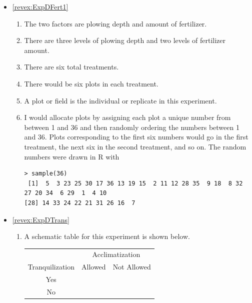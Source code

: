 \documentclass[10pt,openany]{book}\usepackage[]{graphicx}\usepackage[]{color}
\makeatletter
\newenvironment{kframe}{%
 \def\at@end@of@kframe{}%
 \ifinner\ifhmode%
  \def\at@end@of@kframe{\end{minipage}}%
  \begin{minipage}{\columnwidth}%
 \fi\fi%
 \def\FrameCommand##1{\hskip\@totalleftmargin \hskip-\fboxsep
 \colorbox{shadecolor}{##1}\hskip-\fboxsep
     \hskip-\linewidth \hskip-\@totalleftmargin \hskip\columnwidth}%
 \MakeFramed {\advance\hsize-\width
   \@totalleftmargin\z@ \linewidth\hsize
   \@setminipage}}%
 {\par\unskip\endMakeFramed%
 \at@end@of@kframe}
\newenvironment{knitrout}{}{} %
\makeatother
\begin{document}
\begin{itemize}
  \item \hypertarget{ans:ExpDFert1}{\ref{revex:ExpDFert1}}
    \begin{enumerate}
      \item The two factors are plowing depth and amount of fertilizer.
      \item There are three levels of plowing depth and two levels of fertilizer amount.
      \item There are six total treatments.
      \item There would be six plots in each treatment.
      \item A plot or field is the individual or replicate in this experiment.
      \item I would allocate plots by assigning each plot a unique number from between 1 and 36 and then randomly ordering the numbers between 1 and 36.  Plots corresponding to the first six numbers would go in the first treatment, the next six in the second treatment, and so on.  The random numbers were drawn in R with
\begin{knitrout}
\color{fgcolor}\begin{kframe}
\begin{verbatim}
> sample(36)
 [1]  5  3 23 25 30 17 36 13 19 15  2 11 12 28 35  9 18  8 32 27 20 34  6 29  1  4 10
[28] 14 33 24 22 21 31 26 16  7
\end{verbatim}
\end{kframe}
\end{knitrout}
    \end{enumerate}

  \item \hypertarget{ans:ExpDTrans}{\ref{revex:ExpDTrans}}
    \begin{enumerate}
      \item A schematic table for this experiment is shown below.

\begin{tabular}{cc|c|}
 & \multicolumn{2}{c}{Acclimatization} \\
\cline{2-3}
\multicolumn{1}{c|}{Tranquilization} & Allowed & Not Allowed \\
\hline
\multicolumn{1}{c|}{Yes} &  & \multicolumn{1}{c|}{} \\
\hline
\multicolumn{1}{c|}{No} &  &  \multicolumn{1}{c|}{} \\
\cline{2-3}
\end{tabular}


\end{enumerate}
\end{itemize}
\end{document}
